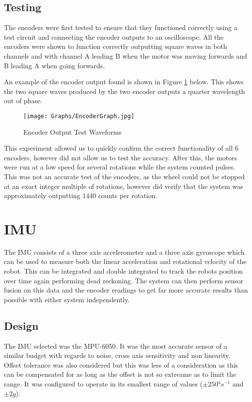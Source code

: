 \subsection{Testing}\label{elec/encoder/test}
The encoders were first tested to ensure that they functioned correctly using a test circuit and connecting the encoder outputs to an oscilloscope. All the encoders were shown to function correctly outputting square waves in both channels and with channel A leading B when the motor was moving forwards and B leading A when going forwards. 

An example of the encoder output found is shown in Figure 
\ref{EncoderGraph} below. This shows the two square waves produced by the 
two encoder outputs a quarter wavelength out of phase.

\begin{figure}[!ht]
	\centering
	\texttt{[image: Graphs/EncoderGraph.jpg]}
	\caption{Encoder Output Test Waveforms}\label{EncoderGraph}

\end{figure}

This experiment allowed us to quickly confirm the correct functionality of 
all 6 encoders, however did not allow us to test the accuracy. After this, 
the motors were run at a low speed for several rotations while the system counted pulses. This was not an accurate test of the encoders, as the wheel could not be stopped at an exact integer multiple of rotations, however did verify that the system was approximately outputting 1440 counts per rotation. 

\section{IMU}\label{elec/imu}
The IMU consists of a three axis accelerometer and a three axis gyroscope which can be used to measure both the linear acceleration and rotational velocity of the robot. This can be integrated and double integrated to track the robots position over time again performing dead reckoning. The system can then perform sensor fusion on this data and the encoder readings to get far more accurate results than possible with either system independently. 

\subsection{Design}\label{elec/imu/design}
The IMU selected was the MPU-6050. It was the most accurate sensor of a similar budget with regards to noise, cross axis sensitivity and non linearity. Offset tolerance was also considered but this was less of a consideration as this can be compensated for as long as the offset is not so extreame as to limit the range. It was configured to operate in its smallest range of values ($\pm\ang{250}s^{-1}$ and $\pm2g$\cite{}).

